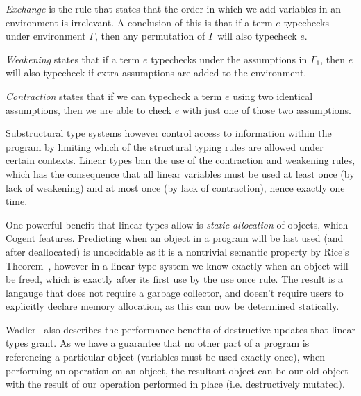 \textit{Exchange} is the rule that states that the order in which we add variables in an environment
is irrelevant. A conclusion of this is that if a term $e$ typechecks under environment $\Gamma$,
then any permutation of $\Gamma$ will also typecheck $e$.

\textit{Weakening} states that if a term $e$ typechecks under the assumptions
in $\Gamma_1$, then $e$ will also typecheck if extra assumptions are added to the environment.

\textit{Contraction} states that if we can typecheck a term $e$ using two identical
assumptions, then we are able to check $e$ with just one of those two assumptions.

Substructural type systems however control access to information within the program by limiting which
of the structural typing rules are allowed under certain contexts. Linear types ban the use of the
contraction and weakening rules, which has the consequence that all linear variables must be used 
at least once (by lack of weakening) and at most once (by lack of contraction), hence exactly one time.

One powerful benefit that linear types allow is \textit{static allocation} of objects, which Cogent
features. Predicting when an object in a program will be last used (and after deallocated)
is undecidable as it is a nontrivial semantic property by Rice's Theorem~\citep{Sipser},
however in a linear type system we know exactly when an object will be freed,
which is exactly after its first use by the use once rule. The result is a langauge that does
not require a garbage collector, and doesn't require users to explicitly declare memory allocation,
as this can now be determined statically.

Wadler~\cite{LinearTypesChangeTheWorld} also describes the performance benefits of destructive updates
that linear types grant. As we have a guarantee that no other part of a program is referencing a particular
object (variables must be used exactly once), when performing an operation on an object, the resultant
object can be our old object with the result of our operation performed in place (i.e. destructively
mutated).

